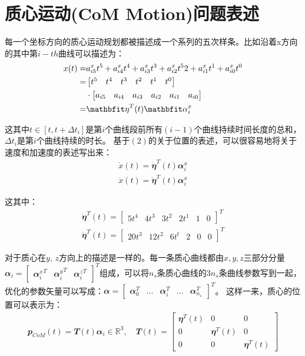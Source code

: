 \section{质心运动(CoM Motion)问题表述}
每一个坐标方向的质心运动规划都被描述成一个系列的五次样条。比如沿着x方向的其中第$i-th$曲线可以描述为\cite[p7]{Bellicoso_Jenelten_Gehring_Hutter_2018}：
\begin{align}
    x(t) = & a_{i5}^x t^5 +  a_{i4}^x t^4 + a_{i3}^x t^3 +  a_{i2}^x t^52+  a_{i1}^x t^1 +  a_{i0}^x t^0 \notag\\
    = & \begin{bmatrix}t^5 & t^4 & t^3 & t^2 & t^1 & t^0\end{bmatrix} \notag\\ 
    & \cdot \begin{bmatrix}a_{i5} & a_{i4} & a_{i3} & a_{i2} & a_{i1} & a_{i0}\end{bmatrix} \notag\\
    = & {\mathbfit \eta}^T(t){\mathbfit \alpha}_i^x
\end{align}

 
这其中$t\in [t, t+\Delta t_i]$是第$i$个曲线段前所有$(i-1)$个曲线持续时间长度的总和，$\Delta t_i$是第$i$个曲线持续的时长。
基于$(2)$的关于位置的表述，可以很容易地将关于速度和加速度的表述写出来：
\begin{align}
\dot x(t) = \dot {\mathbfit \eta}^T(t){\mathbfit \alpha}_i^x \\
\ddot x(t) = \ddot {\mathbfit \eta}^T(t) {\mathbfit \alpha}_i^x 
\end{align}

这其中：
\begin{align}
\dot {\mathbfit \eta}^T(t) =  \begin{bmatrix}5t^4 & 4t^3 & 3t^2 & 2t^1 & 1 & 0\end{bmatrix}^T\\
\ddot {\mathbfit \eta}^T(t) =  \begin{bmatrix}20t^3 & 12t^2 & 6t^t & 2 & 0 & 0\end{bmatrix}^T
\end{align}

对于质心在$y,\, z$方向上的描述是一样的。每一条质心曲线都由$x,y,z$三部分分量${\mathbfit \alpha}_i = \begin{bmatrix}{{\mathbfit \alpha}_i^x}^T & {{\mathbfit \alpha}_i^y}^T & {{\mathbfit \alpha}_i^z}^T\end{bmatrix}^T$组成，可以将$n_s$条质心曲线的$3n_s$条曲线参数写到一起，优化的参数矢量可以写成：${\mathbfit \alpha} = \begin{bmatrix}{\mathbfit \alpha}_0^T & ...& {\mathbfit \alpha}_i^T &...& {\mathbfit \alpha}_{n_s}^T\end{bmatrix}^T$。
这样一来，质心的位置可以表示为：
\begin{align}
    {\mathbfit p}_{CoM}(t) = {\mathbfit T}(t){\mathbfit \alpha}_i \in{\mathbb R}^3
    , \quad
    {\mathbfit T}(t) = 
    \begin{bmatrix}
    {\mathbfit \eta}^T(t) & 0 & 0 \\
    0 & {\mathbfit \eta}^T(t) & 0 \\
    0 & 0 & {\mathbfit \eta}^T(t)
    \end{bmatrix}
\end{align}

